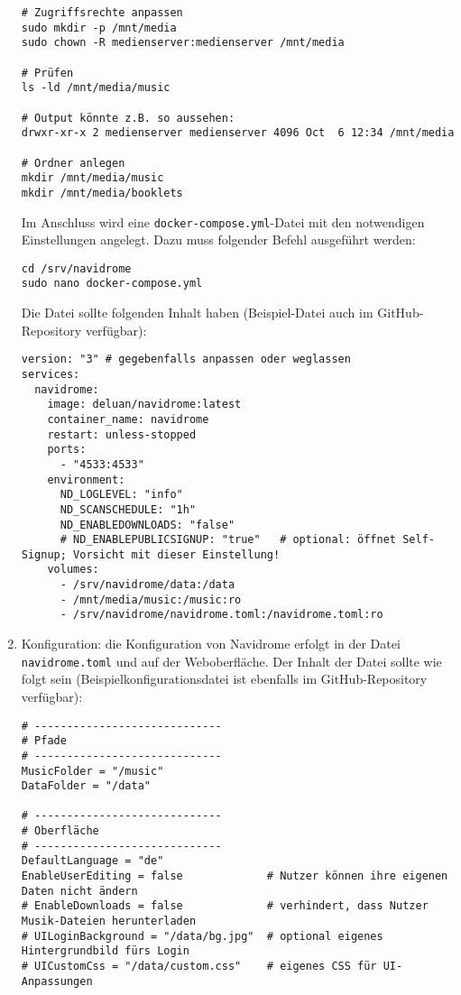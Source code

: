 \documentclass[12pt,a4paper]{report}
\begin{document}
\begin{enumerate}
\begin{verbatim}
# Zugriffsrechte anpassen
sudo mkdir -p /mnt/media
sudo chown -R medienserver:medienserver /mnt/media

# Prüfen
ls -ld /mnt/media/music

# Output könnte z.B. so aussehen:
drwxr-xr-x 2 medienserver medienserver 4096 Oct  6 12:34 /mnt/media

# Ordner anlegen
mkdir /mnt/media/music
mkdir /mnt/media/booklets
\end{verbatim}

    Im Anschluss wird eine \texttt{docker-compose.yml}-Datei mit den notwendigen Einstellungen angelegt. 
    Dazu muss folgender Befehl ausgeführt werden:

    \begin{verbatim}
cd /srv/navidrome
sudo nano docker-compose.yml
    \end{verbatim}

    Die Datei sollte folgenden Inhalt haben (Beispiel-Datei auch im GitHub-Repository verfügbar):
    
    \begin{verbatim}
version: "3" # gegebenfalls anpassen oder weglassen
services:
  navidrome:
    image: deluan/navidrome:latest
    container_name: navidrome
    restart: unless-stopped
    ports:
      - "4533:4533"
    environment:
      ND_LOGLEVEL: "info"
      ND_SCANSCHEDULE: "1h"
      ND_ENABLEDOWNLOADS: "false"
      # ND_ENABLEPUBLICSIGNUP: "true"   # optional: öffnet Self-Signup; Vorsicht mit dieser Einstellung!
    volumes:
      - /srv/navidrome/data:/data
      - /mnt/media/music:/music:ro
      - /srv/navidrome/navidrome.toml:/navidrome.toml:ro
    \end{verbatim}

    \item Konfiguration:
    die Konfiguration von Navidrome erfolgt in der Datei \texttt{navidrome.toml} und auf der Weboberfläche.
    Der Inhalt der Datei sollte wie folgt sein (Beispielkonfigurationsdatei ist ebenfalls im GitHub-Repository verfügbar):
  
    \begin{verbatim}
# -----------------------------
# Pfade
# -----------------------------
MusicFolder = "/music"
DataFolder = "/data"

# -----------------------------
# Oberfläche
# -----------------------------
DefaultLanguage = "de"
EnableUserEditing = false             # Nutzer können ihre eigenen Daten nicht ändern
# EnableDownloads = false             # verhindert, dass Nutzer Musik-Dateien herunterladen
# UILoginBackground = "/data/bg.jpg"  # optional eigenes Hintergrundbild fürs Login
# UICustomCss = "/data/custom.css"    # eigenes CSS für UI-Anpassungen


\end{verbatim}
\end{enumerate}
\end{document}

